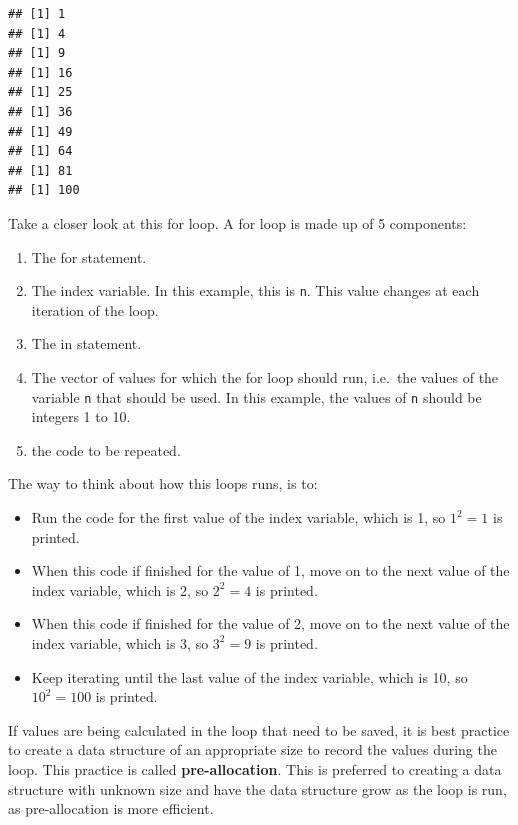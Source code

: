 \documentclass[
]{book}
\providecommand{\tightlist}{%
  \setlength{\itemsep}{0pt}\setlength{\parskip}{0pt}}
\theoremstyle{definition}
\theoremstyle{definition}
\theoremstyle{definition}
\theoremstyle{definition}
\theoremstyle{remark}
\begin{document}
\begin{verbatim}
## [1] 1
## [1] 4
## [1] 9
## [1] 16
## [1] 25
## [1] 36
## [1] 49
## [1] 64
## [1] 81
## [1] 100
\end{verbatim}

Take a closer look at this for loop. A for loop is made up of 5 components:

\begin{enumerate}
\def\labelenumi{\arabic{enumi}.}
\tightlist
\item
  The for statement.
\item
  The index variable. In this example, this is \texttt{n}. This value changes at each iteration of the loop.
\item
  The in statement.
\item
  The vector of values for which the for loop should run, i.e.~the values of the variable \texttt{n} that should be used. In this example, the values of \texttt{n} should be integers 1 to 10.
\item
  the code to be repeated.
\end{enumerate}

The way to think about how this loops runs, is to:

\begin{itemize}
\tightlist
\item
  Run the code for the first value of the index variable, which is 1, so \(1^2 = 1\) is printed.
\item
  When this code if finished for the value of 1, move on to the next value of the index variable, which is 2, so \(2^2 = 4\) is printed.
\item
  When this code if finished for the value of 2, move on to the next value of the index variable, which is 3, so \(3^2 = 9\) is printed.
\item
  Keep iterating until the last value of the index variable, which is 10, so \(10^2 = 100\) is printed.
\end{itemize}

If values are being calculated in the loop that need to be saved, it is best practice to create a data structure of an appropriate size to record the values during the loop. This practice is called \textbf{pre-allocation}. This is preferred to creating a data structure with unknown size and have the data structure grow as the loop is run, as pre-allocation is more efficient.
\end{document}
